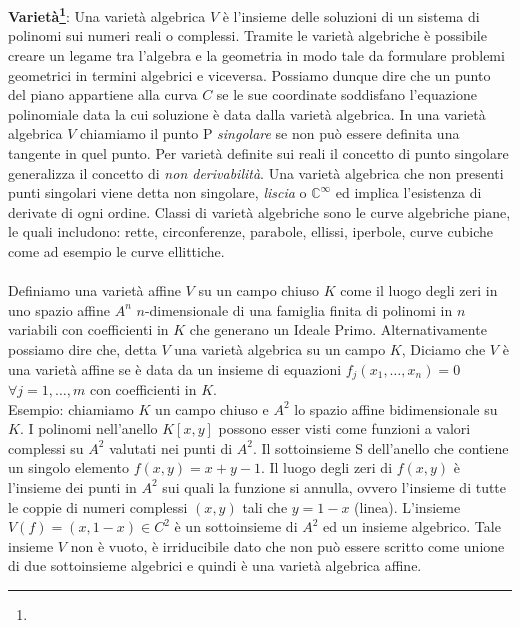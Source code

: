 \documentclass[a4paper,12pt]{tesiinfo}
\renewcommand{\footnotesize}{\fontsize{9pt}{11pt}\selectfont}
\begin{document}
\\\\
%
%
%
\textbf{Variet\`a\footnote{\footnotesize{In inglese dette \textbf{Manifold}}}}: Una variet\`a algebrica $V$ \`e l'insieme delle soluzioni di un sistema di polinomi sui numeri reali o complessi. Tramite le variet\`a algebriche \`e possibile creare un legame tra l'algebra e la geometria in modo tale da formulare problemi geometrici in termini algebrici e viceversa. Possiamo dunque dire che un punto del piano appartiene alla curva $C$ se le sue coordinate soddisfano l'equazione polinomiale data la cui soluzione \`e data dalla variet\`a algebrica.
In una variet\`a algebrica $V$ chiamiamo il punto P \textit{singolare} se non pu\`o essere definita una tangente in quel punto. Per variet\`a definite sui reali il concetto di punto singolare generalizza il concetto di \textit{non derivabilit\`a}. Una variet\`a algebrica che non presenti punti singolari viene detta non singolare, \textit{liscia} o $\mathbb{C}^ {\infty}$ ed implica l'esistenza di derivate di ogni ordine.
Classi di variet\`a algebriche sono le curve algebriche piane, le quali includono: rette, circonferenze, parabole, ellissi, iperbole, curve cubiche come ad esempio le curve ellittiche.
\\\\
Definiamo una variet\`a affine $V$ su un campo chiuso $K$ come il luogo degli zeri in uno spazio affine $A^n$ $n$-dimensionale di una famiglia finita di polinomi in $n$ variabili con coefficienti in $K$ che generano un Ideale Primo. Alternativamente possiamo dire che, detta $V$ una variet\`a algebrica su un campo $K$, Diciamo che $V$ \`e una variet\`a affine se \`e data da un insieme di equazioni $f_j(x_1, \ldots , x_n) = 0$ $\forall j = 1, \ldots, m$ con coefficienti in $K$.
\\
Esempio: chiamiamo $K$ un campo chiuso e $A^2$ lo spazio affine bidimensionale su $K$. I polinomi nell'anello $K[x, y]$ possono esser visti come funzioni a valori complessi su $A^2$ valutati nei punti di $A^2$. Il sottoinsieme S dell'anello che contiene un singolo elemento $f(x, y) = x + y - 1$. Il luogo degli zeri di $f(x, y)$ \`e l'insieme dei punti in $A^2$ sui quali la funzione si annulla, ovvero l'insieme di tutte le coppie di numeri complessi $(x, y)$ tali che $y = 1 - x$ (linea). L'insieme $V(f) = {(x, 1-x) \in C^2}$ \`e un sottoinsieme di $A^2$ ed un insieme algebrico. Tale insieme $V$ non \`e vuoto, \`e irriducibile dato che non pu\`o essere scritto come unione di due sottoinsieme algebrici e quindi \`e una variet\`a algebrica affine.
\end{document}
